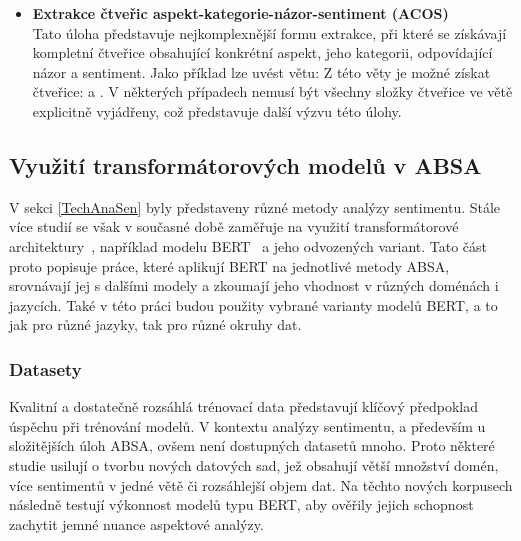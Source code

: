 \begin{itemize}
    \item \textbf{Extrakce čtveřic aspekt-kategorie-názor-sentiment (ACOS)} \\
    Tato úloha představuje nejkomplexnější formu extrakce, při které se získávají kompletní čtveřice obsahující konkrétní aspekt, jeho kategorii, odpovídající názor a sentiment. Jako příklad lze uvést větu:  Z této věty je možné získat čtveřice:  a . V některých případech nemusí být všechny složky čtveřice ve větě explicitně vyjádřeny, což představuje další výzvu této úlohy.~\cite{MAO2024102048, cai-etal-2021-aspect}
\end{itemize}

\subsection{Využití transformátorových modelů v ABSA}
V sekci \ref{TechAnaSen} byly představeny různé metody analýzy sentimentu. Stále více studií se však v současné době zaměřuje na využití transformátorové architektury~\cite{vaswani2023attentionneed}, například modelu BERT~\cite{devlin2019bert} a jeho odvozených variant. Tato část proto popisuje práce, které aplikují BERT na jednotlivé metody ABSA, srovnávají jej s dalšími modely a zkoumají jeho vhodnost v různých doménách i jazycích. Také v této práci budou použity vybrané varianty modelů BERT, a to jak pro různé jazyky, tak pro různé okruhy dat.

\subsubsection{Datasety}
Kvalitní a dostatečně rozsáhlá trénovací data představují klíčový předpoklad úspěchu při trénování modelů. V kontextu analýzy sentimentu, a především u složitějších úloh ABSA, ovšem není dostupných datasetů mnoho. Proto některé studie usilují o tvorbu nových datových sad, jež obsahují větší množství domén, více sentimentů v jedné větě či rozsáhlejší objem dat. Na těchto nových korpusech následně testují výkonnost modelů typu BERT, aby ověřily jejich schopnost zachytit jemné nuance aspektové analýzy.

